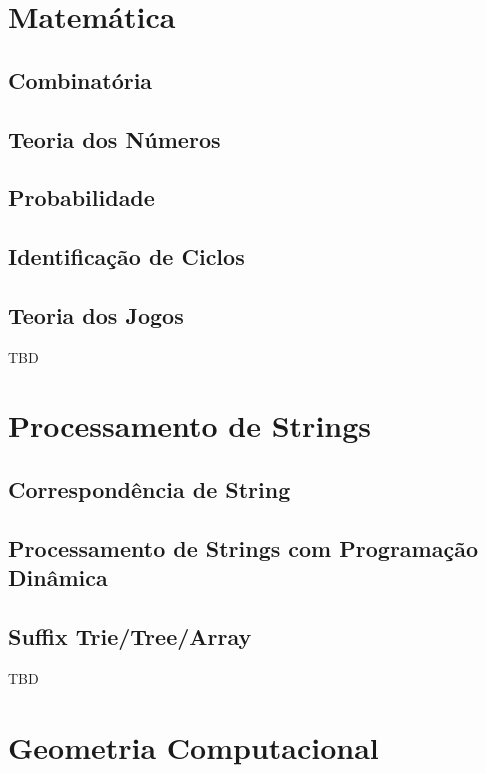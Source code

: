 \documentclass[11pt]{scrartcl}
\begin{document}
\section{Matemática}

\subsection{Combinatória}

\subsection{Teoria dos Números}

\subsection{Probabilidade}

\subsection{Identificação de Ciclos}

\subsection{Teoria dos Jogos}

TBD


\section{Processamento de Strings}

\subsection{Correspondência de String}

\subsection{Processamento de Strings com Programação Dinâmica}

\subsection{Suffix Trie/Tree/Array}

TBD


\section{Geometria Computacional}
\end{document}
